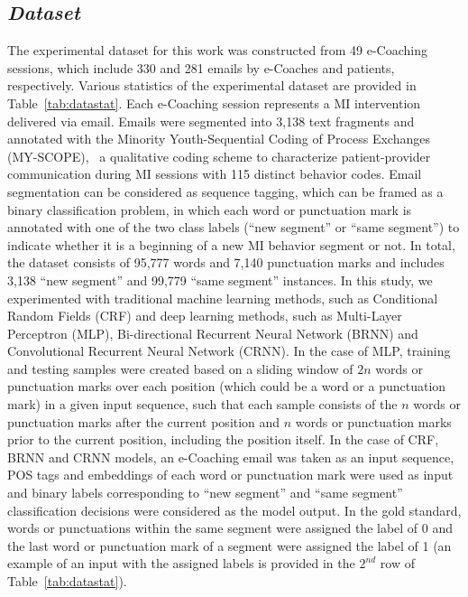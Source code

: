 \documentclass{amia}
\begin{document}
\subsection*{\textit{Dataset}}
The experimental dataset for this work was constructed from 49 e-Coaching sessions, which include 330 and 281 emails by e-Coaches and patients, respectively. Various statistics of the experimental dataset are provided in Table~\ref{tab:datastat}. Each e-Coaching session represents a MI intervention delivered via email. Emails were segmented into 3,138 text fragments and annotated with the Minority Youth-Sequential Coding of Process Exchanges (MY-SCOPE),~\cite{carcone2013provider} a qualitative coding scheme to characterize patient-provider communication during MI sessions with 115 distinct behavior codes. Email segmentation can be considered as sequence tagging, which can be framed as a binary classification problem, in which each word or punctuation mark is annotated with one of the two class labels (``new segment'' or ``same segment'') to indicate whether it is a beginning of a new MI behavior segment or not. In total, the dataset consists of 95,777 words and 7,140 punctuation marks and includes 3,138 ``new segment'' and 99,779 ``same segment'' instances. In this study, we experimented with traditional machine learning methods, such as Conditional Random Fields (CRF)\cite{lafferty2001conditional} and deep learning methods, such as Multi-Layer Perceptron (MLP),\cite{rumelhart1986learning} Bi-directional Recurrent Neural Network (BRNN)\cite{schuster1997bidirectional} and Convolutional Recurrent Neural Network (CRNN).\cite{treviso2017sentence} In the case of MLP, training and testing samples were created based on a sliding window of $2n$ words or punctuation marks over each position (which could be a word or a punctuation mark) in a given input sequence, such that each sample consists of the $n$ words or punctuation marks after the current position and $n$ words or punctuation marks prior to the current position, including the position itself. In the case of CRF, BRNN and CRNN models, an e-Coaching email was taken as an input sequence, POS tags and embeddings of each word or punctuation mark were used as input and binary labels corresponding to ``new segment'' and ``same segment'' classification decisions were considered as the model output. In the gold standard, words or punctuations within the same segment were assigned the label of 0 and the last word or punctuation mark of a segment were assigned the label of 1 (an example of an input with the assigned labels is provided in the $2^{nd}$ row of Table~\ref{tab:datastat}). 
\end{document}
